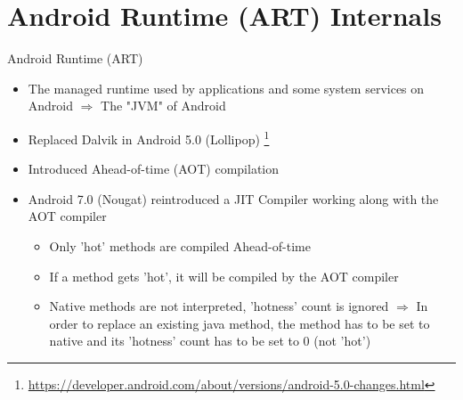 \section{Android Runtime (ART) Internals}
\begin{frame}{Android Runtime (ART)}
    \begin{itemize}
    \item The managed runtime used by applications and some system services on Android
    $\Rightarrow$ The "JVM" of Android
    \item Replaced Dalvik in Android 5.0 (Lollipop) \footnote{\url{https://developer.android.com/about/versions/android-5.0-changes.html}}
    \item Introduced Ahead-of-time (AOT) compilation
    \item Android 7.0 (Nougat) reintroduced a JIT Compiler working along with the AOT compiler
    \begin{itemize}
    	\item Only 'hot' methods are compiled Ahead-of-time 
    	\item If a method gets 'hot', it will be compiled by the AOT compiler
    	\item Native methods are not interpreted, 'hotness' count is ignored \newline
    	$\Rightarrow$ In order to replace an existing java method, the method has to be set to native and its 'hotness' count has to be set to 0 (not 'hot')
    \end{itemize}
    \end{itemize}
\end{frame}



